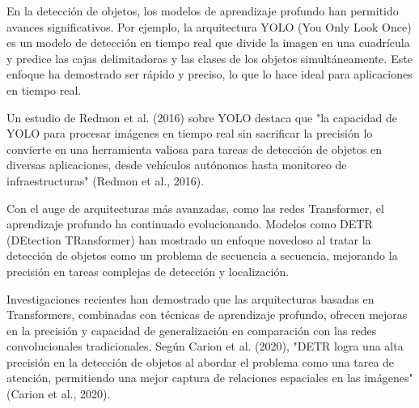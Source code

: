 En la detección de objetos, los modelos de aprendizaje profundo han permitido avances significativos. Por ejemplo, la arquitectura YOLO (You Only Look Once) es un modelo de detección en tiempo real que divide la imagen en una cuadrícula y predice las cajas delimitadoras y las clases de los objetos simultáneamente. Este enfoque ha demostrado ser rápido y preciso, lo que lo hace ideal para aplicaciones en tiempo real.

Un estudio de Redmon et al. (2016) sobre YOLO destaca que "la capacidad de YOLO para procesar imágenes en tiempo real sin sacrificar la precisión lo convierte en una herramienta valiosa para tareas de detección de objetos en diversas aplicaciones, desde vehículos autónomos hasta monitoreo de infraestructuras" (Redmon et al., 2016).

Con el auge de arquitecturas más avanzadas, como las redes Transformer, el aprendizaje profundo ha continuado evolucionando. Modelos como DETR (DEtection TRansformer) han mostrado un enfoque novedoso al tratar la detección de objetos como un problema de secuencia a secuencia, mejorando la precisión en tareas complejas de detección y localización.

Investigaciones recientes han demostrado que las arquitecturas basadas en Transformers, combinadas con técnicas de aprendizaje profundo, ofrecen mejoras en la precisión y capacidad de generalización en comparación con las redes convolucionales tradicionales. Según Carion et al. (2020), "DETR logra una alta precisión en la detección de objetos al abordar el problema como una tarea de atención, permitiendo una mejor captura de relaciones espaciales en las imágenes" (Carion et al., 2020).

